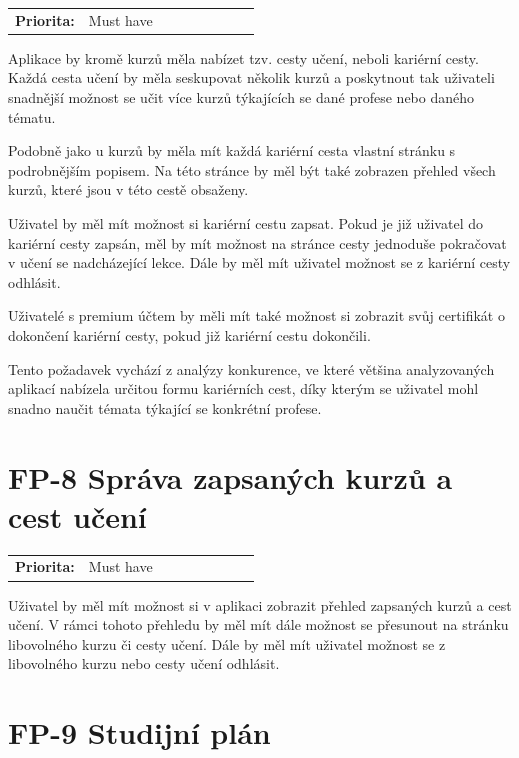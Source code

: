\begin{tabular}{lp{0.7\linewidth}}
    \textbf{Priorita:} & Must have \\
\end{tabular}

Aplikace by kromě kurzů měla nabízet tzv. cesty učení, neboli kariérní cesty. Každá cesta učení by měla seskupovat několik kurzů a poskytnout tak uživateli snadnější možnost se učit více kurzů týkajících se dané profese nebo daného tématu.

Podobně jako u kurzů by měla mít každá kariérní cesta vlastní stránku s podrobnějším popisem. Na této stránce by měl být také zobrazen přehled všech kurzů, které jsou v této cestě obsaženy. 

Uživatel by měl mít možnost si kariérní cestu zapsat. Pokud je již uživatel do kariérní cesty zapsán, měl by mít možnost na stránce cesty jednoduše pokračovat v učení se nadcházející lekce. Dále by měl mít uživatel možnost se z kariérní cesty odhlásit.

Uživatelé s premium účtem by měli mít také možnost si zobrazit svůj certifikát o dokončení kariérní cesty, pokud již kariérní cestu dokončili.

Tento požadavek vychází z analýzy konkurence, ve které většina analyzovaných aplikací nabízela určitou formu kariérních cest, díky kterým se uživatel mohl snadno naučit témata týkající se konkrétní profese.

\section{FP-8 Správa zapsaných kurzů a cest učení}\label{sec:fp-course-management}

\begin{tabular}{lp{0.7\linewidth}}
    \textbf{Priorita:} & Must have \\
\end{tabular}

Uživatel by měl mít možnost si v aplikaci zobrazit přehled zapsaných kurzů a cest učení. V rámci tohoto přehledu by měl mít dále možnost se přesunout na stránku libovolného kurzu či cesty učení. Dále by měl mít uživatel možnost se z libovolného kurzu nebo cesty učení odhlásit.

\section{FP-9 Studijní plán}\label{sec:fp-study-plan}

